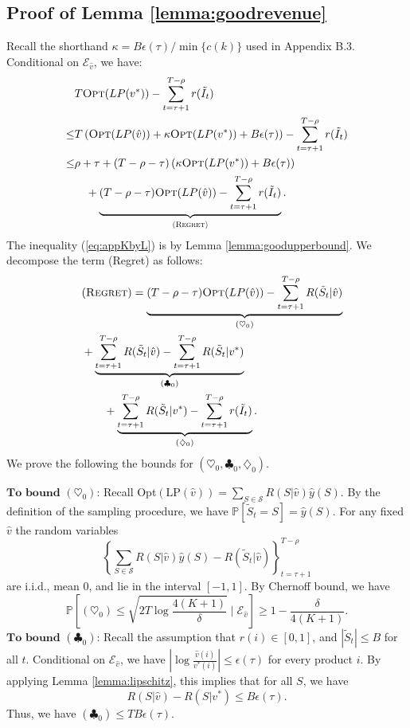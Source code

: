 \documentclass{article}
\theoremstyle{definition}
\newcommand{\PPP}{\mathbb{P}}
\newcommand{\SSS}{\mathcal{S}}
\begin{document}
\subsection{Proof of Lemma \ref{lemma:goodrevenue}}
Recall the shorthand $\kappa = B\epsilon(\tau)/\min\{c(k)\}$ used in Appendix B.3. Conditional on $\mathcal{E}_{\hat{v}}$, we have:
\begin{align}
&T \text{{\sc Opt}}(LP(v^*)) - \sum^{T-\rho}_{t=\tau +1} r(\tilde{I}_t) \nonumber\\
\leq& T\left(\text{{\sc Opt}}(LP(\hat{v})) + \kappa\text{{\sc Opt}}(LP(v^*)) + B\epsilon(\tau)\right) -\sum^{T-\rho}_{t=\tau + 1}r(\tilde{I}_t)\label{eq:appKbyL}\\
\leq &\rho + \tau + (T-\rho-\tau)\left(\kappa\text{{\sc Opt}}(LP(v^*)) + B\epsilon(\tau)\right) \nonumber\\
&\quad + \underbrace{(T- \rho-\tau)\text{{\sc Opt}}(LP(\hat{v})) - \sum^{T-\rho}_{t=\tau + 1}r(\tilde{I}_t)}_{\text{{\sc (Regret)}}} \label{eq:appKregret}.
\end{align}
The inequality (\ref{eq:appKbyL}) is by Lemma \ref{lemma:goodupperbound}. We decompose the term ({\sc Regret}) as follows:
\begin{align}
&(\text{{\sc Regret}})= \underbrace{(T- \rho-\tau)\text{{\sc Opt}}(LP(\hat{v}))- \sum^{T-\rho}_{t = \tau+ 1}R(\tilde{S}_t|\hat{v})}_{(\heartsuit_0)}\nonumber\\
\quad & +\underbrace{ \sum^{T-\rho}_{t = \tau+ 1} R(\tilde{S}_t|\hat{v}) -  \sum^{T-\rho}_{t = \tau+ 1}R(\tilde{S}_t|v^*)}_{(\clubsuit_0)} \nonumber\\
&\qquad +\underbrace{\sum^{T-\rho}_{t = \tau+ 1}R(\tilde{S}_t|v^*) - \sum^{T-\rho}_{t = \tau+ 1}r(\tilde{I}_t)}_{(\diamondsuit_0)}.\nonumber 
\end{align}
We prove the following the bounds for $(\heartsuit_0, \clubsuit_0, \diamondsuit_0)$.

$\textbf{To bound $(\heartsuit_0)$:}$ Recall {\sc Opt}$(\text{LP}(\hat{v})) = \sum_{S\in\SSS} R(S|\hat{v})\hat{y}(S)$. By the definition of the sampling procedure, we have $\PPP[\tilde{S}_t = S] = \hat{y}(S)$. For any fixed $\hat{v}$ the random variables $$\left\{ \sum_{S \in \SSS} R(S|\hat{v})\hat{y}(S) - R(\tilde{S}_t|\hat{v})\right\}^{T-\rho}_{t = \tau+1}$$ are i.i.d., mean 0, and lie in the interval $[-1, 1]$. By Chernoff bound, we have
\begin{equation*}
\PPP\left[(\heartsuit_0) \leq \sqrt{2T\log\frac{4(K+1)}{\delta}}\mid \mathcal{E}_{\hat{v}}\right] \geq 1 - \frac{\delta}{4(K+1)}.
\end{equation*}
$\textbf{To bound $(\clubsuit_0)$:}$ Recall the assumption that $r(i)\in [0,1]$, and $|\tilde{S}_t|\leq B$ for all $t$. Conditional on $\mathcal{E}_{\hat{v}}$, we have $\left|\log\frac{\hat{v}(i)}{v^*(i)}\right|\leq \epsilon(\tau)$ for every product $i$. By applying Lemma \ref{lemma:lipschitz}, this implies that for all $S$, we have 
$$R(S | \hat{v}) - R(S | v^*)\leq B\epsilon(\tau).$$
Thus, we have $(\clubsuit_0)\leq TB\epsilon(\tau).$
 
\end{document}
